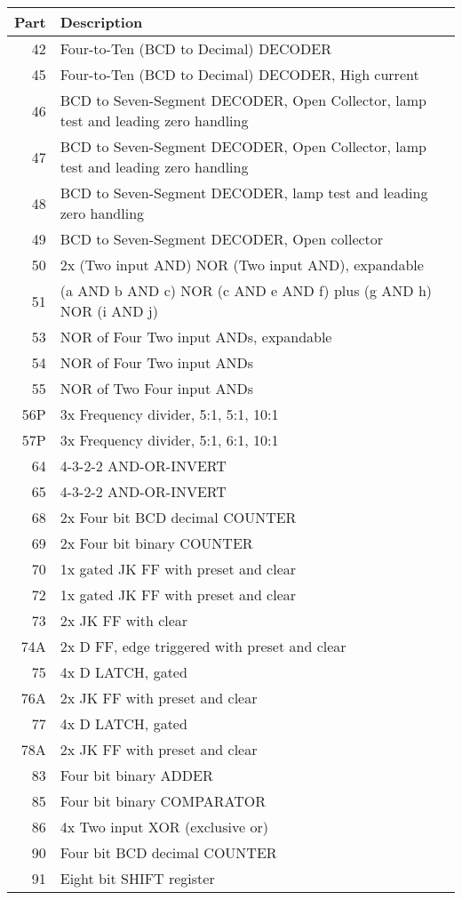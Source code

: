 \begin{tabular}{rl}
Part & Description \\\hline
42 & Four-to-Ten (BCD to Decimal) DECODER\\
45 & Four-to-Ten (BCD to Decimal) DECODER, High current\\
46 & BCD to Seven-Segment DECODER, Open Collector, lamp test and leading zero handling\\
47 & BCD to Seven-Segment DECODER, Open Collector, lamp test and leading zero handling\\
48 & BCD to Seven-Segment DECODER, lamp test and leading zero handling\\
49 & BCD to Seven-Segment DECODER, Open collector\\
50 & 2x (Two input AND) NOR (Two input AND), expandable\\
51 & (a AND b AND c) NOR (c AND e AND f) plus (g AND h) NOR (i AND j)\\
53 & NOR of Four Two input ANDs, expandable\\
54 & NOR of Four Two input ANDs\\
55 & NOR of Two Four input ANDs\\
56P & 3x Frequency divider, 5:1, 5:1, 10:1\\
57P & 3x Frequency divider, 5:1, 6:1, 10:1\\
64 & 4-3-2-2 AND-OR-INVERT\\
65 & 4-3-2-2 AND-OR-INVERT\\
68 & 2x Four bit BCD decimal COUNTER\\
69 & 2x Four bit binary COUNTER\\
70 & 1x gated JK FF with preset and clear\\
72 & 1x gated JK FF with preset and clear\\
73 & 2x JK FF with clear\\
74A & 2x D FF, edge triggered with preset and clear\\
75 & 4x D LATCH, gated\\
76A & 2x JK FF with preset and clear\\
77 & 4x D LATCH, gated\\
78A & 2x JK FF with preset and clear\\
83 & Four bit binary ADDER\\
85 & Four bit binary COMPARATOR\\
86 & 4x Two input XOR (exclusive or)\\
90 & Four bit BCD decimal COUNTER\\
91 & Eight bit SHIFT register\\

\end{tabular}
